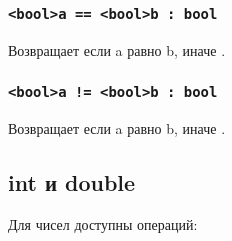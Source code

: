 \documentclass[a4paper, 14pt]{extarticle}
\begin{document}
\subsubsection{\lstinline`<bool>a == <bool>b : bool`}
	Возвращает  если a равно b, иначе .
\subsubsection{\lstinline`<bool>a != <bool>b : bool`}
	Возвращает  если a равно b, иначе .

\subsection{{\color{bluemarin}int} и {\color{bluemarin}double}}

	Для чисел доступны операций:
\end{document}
